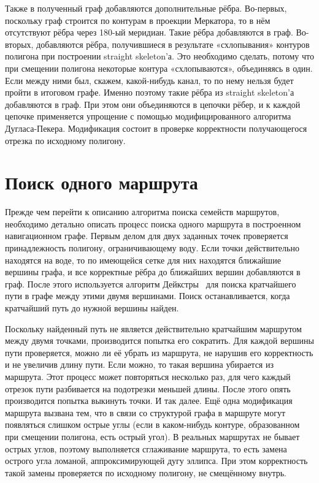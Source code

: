 Также в полученный граф добавляются дополнительные рёбра. Во-первых,
поскольку граф строится по контурам в проекции Меркатора, то в нём
отсутствуют рёбра через 180-ый меридиан. Такие рёбра добавляются в
граф. Во-вторых, добавляются рёбра, получившиеся в результате
«схлопывания» контуров полигона при построении straight skeleton'а.
Это необходимо сделать, потому что при смещении полигона некоторые
контура «схлопываются», объединяясь в один. Если между ними был,
скажем, какой-нибудь канал, то по нему нельзя будет пройти в итоговом
графе. Именно поэтому такие рёбра из straight skeleton'а добавляются в
граф. При этом они объединяются в цепочки рёбер, и к каждой цепочке
применяется упрощение с помощью модифицированного алгоритма
Дугласа-Пекера. Модификация состоит в проверке корректности
получающегося отрезка по исходному полигону.

\FloatBarrier

\section{Поиск одного маршрута}

Прежде чем перейти к описанию алгоритма поиска семейств маршрутов,
необходимо детально описать процесс поиска одного маршрута в
построенном навигационном графе. Первым делом для двух заданных точек
проверяется принадлежность полигону, ограничивающему воду. Если точки
действительно находятся на воде, то по имеющейся сетке для них
находятся ближайшие вершины графа, и все корректные рёбра до ближайших
вершин добавляются в граф. После этого используется алгоритм
Дейкстры~\cite{dijkstra1959note} для поиска кратчайшего пути в графе между
этими двумя вершинами. Поиск останавливается, когда кратчайший путь до
нужной вершины найден.

Поскольку найденный путь не является действительно кратчайшим
маршрутом между двумя точками, производится попытка его сократить. Для
каждой вершины пути проверяется, можно ли её убрать из маршрута, не
нарушив его корректность и не увеличив длину пути. Если можно, то
такая вершина убирается из маршрута. Этот процесс может повторяться
несколько раз, для чего каждый отрезок пути разбивается на подотрезки
меньшей длины. После этого опять производится попытка выкинуть точки.
И так далее. Ещё одна модификация маршрута вызвана тем, что в связи со
структурой графа в маршруте могут появляться слишком острые углы (если
в каком-нибудь контуре, образованном при смещении полигона, есть
острый угол). В реальных маршрутах не бывает острых углов, поэтому
выполняется сглаживание маршрута, то есть замена острого угла ломаной,
аппроксимирующей дугу эллипса. При этом корректность такой замены
проверяется по исходному полигону, не смещённому внутрь.

